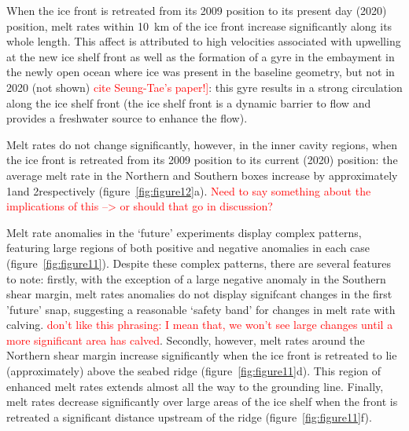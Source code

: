 \documentclass[draft]{agujournal2019}
\newcommand{\red}[1]{\textcolor{red}{#1}}
\begin{document}
When the ice front is retreated from its 2009 position to its present day (2020) position, melt rates within 10~km of the ice front increase significantly along its whole length. This affect is attributed to high velocities associated with upwelling at the new ice shelf front as well as the formation of a gyre in the embayment in the newly open ocean where ice was present in the baseline geometry, but not in 2020 (not shown) \red{cite Seung-Tae's paper!]}: this gyre results in a strong circulation along the ice shelf front (the ice shelf front is a dynamic barrier to flow and provides a freshwater source to enhance the flow). 

Melt rates do not change significantly, however, in the inner cavity regions, when the ice front is retreated from its 2009 position to its current (2020) position: the average melt rate in the Northern and Southern boxes increase by approximately 1\mpryr and 2\mpryr respectively (figure~\ref{fig:figure12}a). \red{Need to say something about the implications of this --> or should that go in discussion?}

Melt rate anomalies in the `future' experiments display complex patterns, featuring large regions of both positive and negative anomalies in each case (figure~\ref{fig:figure11}). Despite these complex patterns, there are several features to note: firstly, with the exception of a large negative anomaly in the Southern shear margin, melt rates anomalies do not display signifcant changes in the first 'future' snap, suggesting a reasonable `safety band' for changes in melt rate with calving. \red{don't like this phrasing: I mean that, we won't see large changes until a more significant area has calved}. Secondly, however, melt rates around the Northern shear margin increase significantly when the ice front is retreated to lie (approximately) above the seabed ridge (figure~\ref{fig:figure11}d). This region of enhanced melt rates extends almost all the way to the grounding line.  Finally, melt rates decrease significantly over large areas of the ice shelf when the front is retreated a significant distance upstream of the ridge (figure~\ref{fig:figure11}f).
\end{document}
